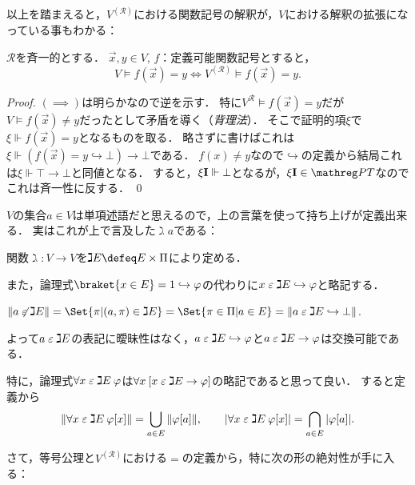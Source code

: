 \documentclass[realisability.tex]{subfiles}
\begin{document}
以上を踏まえると，$V^{(\mathcal{R})}$における関数記号の解釈が，$V$における解釈の拡張になっている事もわかる：
\begin{lemma}\label{lem:func-abs}
 $\mathcal{R}$を斉一的とする．
 $\vec{x}, y \in V$, $f$：定義可能関数記号とすると，
 \[
  V \models f(\vec{x}) = y \iff V^{(\mathcal{R})} \models f(\vec{x}) = y.
 \]
\end{lemma}
\begin{proof}
 $({\implies})$は明らかなので逆を示す．
 特に$V^\mathcal{R} \models f(\vec{x}) = y$だが$V \models f(\vec{x}) \neq y$だったとして矛盾を導く（\emph{背理法}）．
 そこで証明的項$\xi$で$\xi \Vdash f(\vec{x}) = y$となるものを取る．
 略さずに書けばこれは$\xi \Vdash \left(f(\vec{x}) = y \hookrightarrow \bot\right) \to \bot$である．
 $f(x) \neq y$なので$\hookrightarrow$の定義から結局これは$\xi \Vdash \top \to \bot$と同値となる．
 すると，$\xi \mathsf{\mathbf{I}} \Vdash \bot$となるが，$\xi \comb{I} \in \PT$なのでこれは斉一性に反する． \qed
\end{proof}

$V$の集合$a \in V$は単項述語だと思えるので，上の言葉を使って持ち上げが定義出来る．
実はこれが上で言及した$\gimel a$である：

\begin{definition}
 関数$\gimel : V \to V$を$\gimel E \defeq E \times \Pi$により定める．

 また，論理式$\braket{x \in E} = 1 \hookrightarrow \varphi$の代わりに$x \mathrel{\varepsilon} \gimel E \hookrightarrow \varphi$と略記する．
\end{definition}

\begin{remark}
 $\|a \strnin \gimel E\| = \Set{ \pi | (a, \pi) \in \gimel E} = \Set{ \pi \in \Pi | a \in E} = \| a \strin \gimel E \hookrightarrow \bot\|$.

 よって$a \mathrel{\varepsilon} \gimel E$の表記に曖昧性はなく，$a \mathrel{\varepsilon} \gimel E \hookrightarrow \varphi$と$a \mathrel{\varepsilon} \gimel E \to \varphi$は交換可能である．

 特に，論理式$\forall x \mathrel{\varepsilon} \gimel E \: \varphi$は$\forall x \: [ x \mathrel{\varepsilon} \gimel E \to \varphi]$の略記であると思って良い．
 すると定義から
 \[
  \left\| \forall x \mathrel{\varepsilon} \gimel E \: \varphi[x]\right\| = \bigcup_{a \in E} \|\varphi[a]\|, \qquad
  \left\lvert \forall x \mathrel{\varepsilon} \gimel E \: \varphi[x]\right\rvert = \bigcap_{a \in E} |\varphi[a]|.
 \]
\end{remark}

さて，等号公理と$V^{(\mathcal{R})}$における$=$の定義から，特に次の形の絶対性が手に入る：
\end{document}
